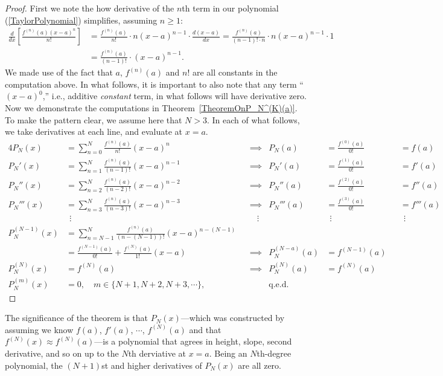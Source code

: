 \begin{proof}
First we note the how derivative of the $n$th term in our polynomial 
(\ref{TaylorPolynomial})
simplifies, assuming $n\ge1$:
\begin{align*}
\frac{d}{dx}\left[\frac{f^{(n)}(a)(x-a)^n}{n!}\right]
          &=\frac{f^{(n)}(a)}{n!}\cdot n(x-a)^{n-1}\cdot\frac{d(x-a)}{dx}
          =\frac{f^{(n)}(a)}{(n-1)!\cdot n}\cdot n(x-a)^{n-1}\cdot1\\
          &=\frac{f^{(n)}(a)}{(n-1)!}\cdot(x-a)^{n-1}.
\end{align*}
We made use of the fact that $a$, $f^{(n)}(a)$ and $n!$ are
all constants in the computation above. In what follows, it is important
to also note that any term ``$(x-a)^0$,'' i.e., additive
{\it constant} term, in what follows will have derivative
zero. Now we demonstrate the
computations in Theorem~\ref{TheoremOnP_N^(K)(a)}.  To make the
pattern clear, we assume here that $N>3$.  In each of what follows,
we take derivatives at each line, and evaluate at $x=a$.
\begin{alignat*}{4}
P_N(x)&=\sum_{n=0}^N\frac{f^{(n)}(a)}{n!}(x-a)^n
        &&\implies&P_N(a)&=\frac{f^{(0)}(a)}{0!}&&=f(a)\\
P_N'(x)&=\sum_{n=1}^N\frac{f^{(n)}(a)}{(n-1)!}(x-a)^{n-1}
        &&\implies&P_N'(a)&=\frac{f^{(1)}(a)}{0!}&&=f'(a)\\
P_N''(x)&=\sum_{n=2}^N\frac{f^{(n)}(a)}{(n-2)!}(x-a)^{n-2}
        &&\implies&P_N''(a)&=\frac{f^{(2)}(a)}{0!}&&=f''(a)\\
P_N'''(x)&=\sum_{n=3}^N\frac{f^{(n)}(a)}{(n-3)!}(x-a)^{n-3}
        &&\implies&P_N'''(a)&=\frac{f^{(3)}(a)}{0!}&&=f'''(a)\\
&\ \ \vdots&&\ \ \ \ \vdots&&\ \ \vdots&&\ \ \vdots\\
P_N^{(N-1)}(x)&=\sum_{n=N-1}^N\frac{f^{(n)}(a)}{(n-(N-1))!}(x-a)^{n-(N-1)}\\
              &=\frac{f^{(N-1)}(a)}{0!}+\frac{f^{(N)}(a)}{1!}(x-a)
              &&\implies &P_N^{(N-a)}(a)&=f^{(N-1)}(a)\\
P_N^{(N)}(x)&=f^{(N)}(a)&&\implies&P_N^{(N)}(a)&=f^{(N)}(a)\\
P_N^{(m)}(x)&=0,\quad m\in\{N+1,N+2,N+3,\cdots\},&&&\text{q.e.d.}
\end{alignat*}
\end{proof}

The significance of the theorem is that  $P_N(x)$---which was
constructed by assuming  we
know $f(a)$, $f'(a)$, $\cdots$, $f^{(N)}(a)$ and
that $f^{(N)}(x)\approx f^{(N)}(a)$---is a polynomial that agrees
in height, slope, second derivative, and so on up to the $N$th 
derviative at $x=a$.  Being an $N$th-degree polynomial, 
the $(N+1)$st and higher derivatives of $P_N(x)$ are all zero.


